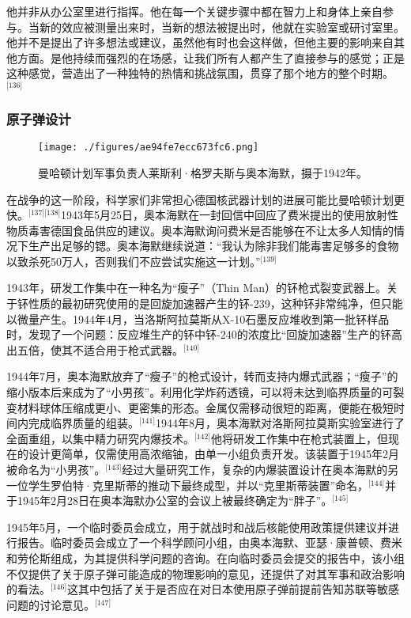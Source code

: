 他并非从办公室里进行指挥。他在每一个关键步骤中都在智力上和身体上亲自参与。当新的效应被测量出来时，当新的想法被提出时，他就在实验室或研讨室里。他并不是提出了许多想法或建议，虽然他有时也会这样做，但他主要的影响来自其他方面。是他持续而强烈的在场感，让我们所有人都产生了直接参与的感觉；正是这种感觉，营造出了一种独特的热情和挑战氛围，贯穿了那个地方的整个时期。\(^\text{[136]}\)
\subsubsection{原子弹设计}
\begin{figure}[ht]
\centering
\texttt{[image: ./figures/ae94fe7ecc673fc6.png]}
\caption{曼哈顿计划军事负责人莱斯利·格罗夫斯与奥本海默，摄于1942年。} \label{fig_ABHM_6}
\end{figure}
在战争的这一阶段，科学家们非常担心德国核武器计划的进展可能比曼哈顿计划更快。\(^\text{[137][138]}\)1943年5月25日，奥本海默在一封回信中回应了费米提出的使用放射性物质毒害德国食品供应的建议。奥本海默询问费米是否能够在不让太多人知情的情况下生产出足够的锶。奥本海默继续说道：“我认为除非我们能毒害足够多的食物以致杀死50万人，否则我们不应尝试实施这一计划。”\(^\text{[139]}\)

1943年，研发工作集中在一种名为“瘦子”（Thin Man）的钚枪式裂变武器上。关于钚性质的最初研究使用的是回旋加速器产生的钚-239，这种钚非常纯净，但只能以微量产生。1944年4月，当洛斯阿拉莫斯从X-10石墨反应堆收到第一批钚样品时，发现了一个问题：反应堆生产的钚中钚-240的浓度比“回旋加速器”生产的钚高出五倍，使其不适合用于枪式武器。\(^\text{[140]}\)

1944年7月，奥本海默放弃了“瘦子”的枪式设计，转而支持内爆式武器；“瘦子”的缩小版本后来成为了“小男孩”。利用化学炸药透镜，可以将未达到临界质量的可裂变材料球体压缩成更小、更密集的形态。金属仅需移动很短的距离，便能在极短时间内完成临界质量的组装。\(^\text{[141]}\)1944年8月，奥本海默对洛斯阿拉莫斯实验室进行了全面重组，以集中精力研究内爆技术。\(^\text{[142]}\)他将研发工作集中在枪式装置上，但现在的设计更简单，仅需使用高浓缩铀，由单一小组负责开发。该装置于1945年2月被命名为“小男孩”。\(^\text{[143]}\)经过大量研究工作，复杂的内爆装置设计在奥本海默的另一位学生罗伯特·克里斯蒂的推动下最终成型，并以“克里斯蒂装置”命名，\(^\text{[144]}\)并于1945年2月28日在奥本海默办公室的会议上被最终确定为“胖子”。\(^\text{[145]}\)

1945年5月，一个临时委员会成立，用于就战时和战后核能使用政策提供建议并进行报告。临时委员会成立了一个科学顾问小组，由奥本海默、亚瑟·康普顿、费米和劳伦斯组成，为其提供科学问题的咨询。在向临时委员会提交的报告中，该小组不仅提供了关于原子弹可能造成的物理影响的意见，还提供了对其军事和政治影响的看法。\(^\text{[146]}\)这其中包括了关于是否应在对日本使用原子弹前提前告知苏联等敏感问题的讨论意见。\(^\text{[147]}\)
